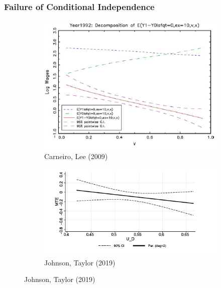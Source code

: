 \documentclass{beamer}
\begin{document}
\begin{frame}
\frametitle{Failure of Conditional Independence}
\centering
\begin{figure}[H]
\begin{subfigure}{0.45\textwidth}
\includegraphics[width=\textwidth]{fig11_1}
\caption{Carneiro, Lee (2009)}
\end{subfigure}
\begin{subfigure}{0.45\textwidth}
\includegraphics[width=\textwidth]{fig11_2}
\caption{Johnson, Taylor (2019)}
\end{subfigure}
\end{figure}
\end{frame}
\end{document}
